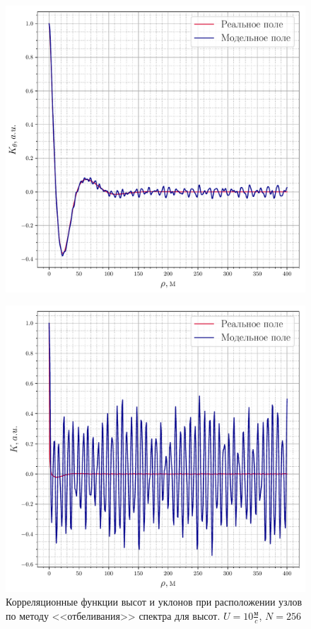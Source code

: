\begin{figure}[h!]
	\begin{minipage}{0.49\linewidth}
			\centering
			\includegraphics[width=\linewidth]{fig/correlation_height_height2.pdf}
			\label{fig:ch22}		
	\end{minipage}
	\hfill
	\begin{minipage}{0.49\linewidth}
			\centering
			\includegraphics[width=\linewidth]{fig/correlation_angles_height2.pdf}
	\end{minipage}
	\caption{Корреляционные функции высот и уклонов при расположении узлов по методу <<отбеливания>> спектра для высот. $U=10 \frac{\text{м}}{c}$, $N=256$}
			\label{fig:ca22}		
\end{figure}


